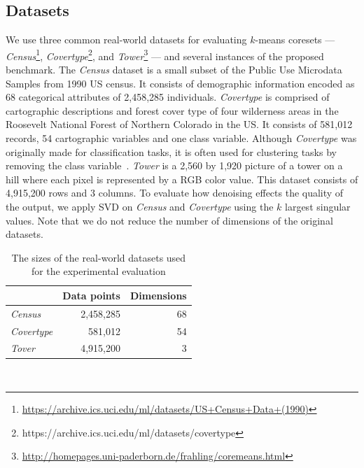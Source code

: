 \subsection{Datasets}
We use three common real-world datasets for evaluating $k$-means coresets 
---
\textit{Census}\footnote{\url{https://archive.ics.uci.edu/ml/datasets/US+Census+Data+(1990)}},
\textit{Covertype}\footnote{https://archive.ics.uci.edu/ml/datasets/covertype}, and 
\textit{Tower}\footnote{\url{http://homepages.uni-paderborn.de/frahling/coremeans.html}}
---
and several instances of the proposed benchmark. 
The \textit{Census} dataset is a small subset of the Public Use Microdata Samples from 1990 US census. It consists of demographic information encoded as 68 categorical attributes of 2,458,285 individuals. \textit{Covertype} is comprised of cartographic descriptions and forest cover type of four wilderness areas in the Roosevelt National Forest of Northern Colorado in the US. It consists of 581,012 records, 54 cartographic variables and one class variable. Although \textit{Covertype} was originally made for classification tasks, it is often used for clustering tasks by removing the class variable~\cite{AckermannMRSLS12}. \textit{Tower} is a 2,560 by 1,920 picture of a tower on a hill where each pixel is represented by a RGB color value. This dataset consists of 4,915,200 rows and 3 columns. To evaluate how denoising effects the quality of the output, we apply SVD on \textit{Census} and \textit{Covertype} using the $k$ largest singular values. Note that we do not reduce the number of dimensions of the original datasets. 


%
\begin{table}
	\begin{center}%
	\caption{The sizes of the real-world datasets used for the experimental evaluation}
	\label{tab:real-world-datasets-overview}
	\begin{tabular}{lrr}
		\toprule
        
		    & Data points
		    & Dimensions
            \\
		\midrule
		\textit{Census}
    		& 2,458,285
    		& 68
    		\\
	    \textit{Covertype}
    	    & 581,012
    		& 54
    		\\
        \textit{Tover}
            & 4,915,200
    		& 3
    		\\
		\bottomrule
	\end{tabular}\\
	\end{center}
\end{table}


